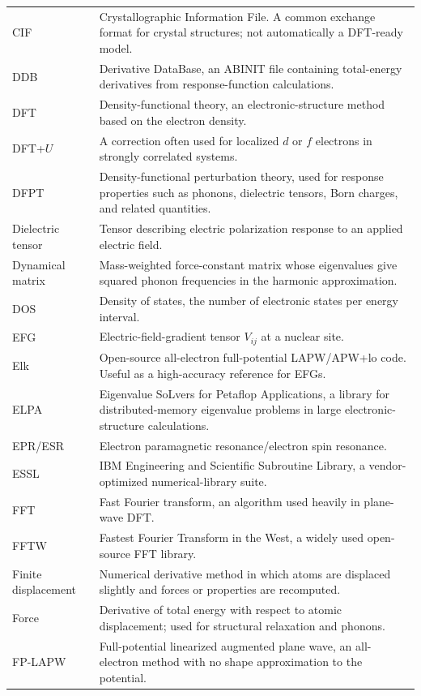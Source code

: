 \documentclass[11pt]{article}
\begin{document}
\begin{longtable}{@{}L{0.18\textwidth}L{0.76\textwidth}@{}}
CIF & Crystallographic Information File.  A common exchange format for crystal structures; not automatically a DFT-ready model. \\
DDB & Derivative DataBase, an ABINIT file containing total-energy derivatives from response-function calculations. \\
DFT & Density-functional theory, an electronic-structure method based on the electron density. \\
DFT+$U$ & A correction often used for localized $d$ or $f$ electrons in strongly correlated systems. \\
DFPT & Density-functional perturbation theory, used for response properties such as phonons, dielectric tensors, Born charges, and related quantities. \\
Dielectric tensor & Tensor describing electric polarization response to an applied electric field. \\
Dynamical matrix & Mass-weighted force-constant matrix whose eigenvalues give squared phonon frequencies in the harmonic approximation. \\
DOS & Density of states, the number of electronic states per energy interval. \\
EFG & Electric-field-gradient tensor $V_{ij}$ at a nuclear site. \\
Elk & Open-source all-electron full-potential LAPW/APW+lo code.  Useful as a high-accuracy reference for EFGs. \\
ELPA & Eigenvalue SoLvers for Petaflop Applications, a library for distributed-memory eigenvalue problems in large electronic-structure calculations. \\
EPR/ESR & Electron paramagnetic resonance/electron spin resonance. \\
ESSL & IBM Engineering and Scientific Subroutine Library, a vendor-optimized numerical-library suite. \\
FFT & Fast Fourier transform, an algorithm used heavily in plane-wave DFT. \\
FFTW & Fastest Fourier Transform in the West, a widely used open-source FFT library. \\
Finite displacement & Numerical derivative method in which atoms are displaced slightly and forces or properties are recomputed. \\
Force & Derivative of total energy with respect to atomic displacement; used for structural relaxation and phonons. \\
FP-LAPW & Full-potential linearized augmented plane wave, an all-electron method with no shape approximation to the potential. \\

\end{longtable}
\end{document}
